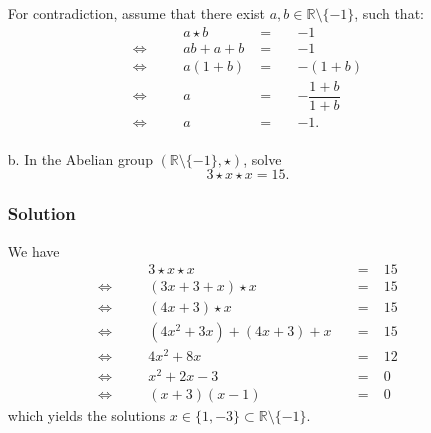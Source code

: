 \documentclass[11pt]{article}
\newcommand{\R}{\mathbb{R}}
\theoremstyle{definition}
\theoremstyle{plain}
\theoremstyle{remark}
\begin{document}
\begin{enumerate}
          For contradiction, assume that there exist \(a, b \in \R \setminus \{-1\}\), such that:
          \[
              \begin{alignedat}{3}
                            &  & a \star b  & \; = \; &  & -1                    \\
                  \iff\quad &  & ab + a + b & \; = \; &  & -1                    \\
                  \iff\quad &  & a (1 + b)  & \; = \; &  & - (1 + b)             \\
                  \iff\quad &  & a          & \; = \; &  & -\dfrac{1 + b}{1 + b} \\
                  \iff\quad &  & a          & \; = \; &  & -1.                   \\
              \end{alignedat}
          \]

    \item[b.] In the Abelian group \(\left(\R \setminus \{-1\}, \star \right)\), solve
          \[
              3 \star x \star x = 15.
          \]

          \subsubsection*{Solution}

          We have
          \[
              \begin{alignedat}{3}
                            &  & 3 \star x \star x          &  & \; = \; & 15 \\
                  \iff\quad &  & (3x + 3 + x) \star x       &  & \; =\;  & 15 \\
                  \iff\quad &  & (4x + 3) \star x           &  & \; =\;  & 15 \\
                  \iff\quad &  & (4x^2 + 3x) + (4x + 3) + x &  & \; =\;  & 15 \\
                  \iff\quad &  & 4x^2 + 8x                  &  & \; =\;  & 12 \\
                  \iff\quad &  & x^2 + 2x -3                &  & \; =\;  & 0  \\
                  \iff\quad &  & (x + 3) (x - 1)            &  & \; =\;  & 0
              \end{alignedat}
          \]
          which yields the solutions \(x \in \{1, -3\} \subset \R \setminus \{-1\}\).

\end{enumerate}
\end{document}
